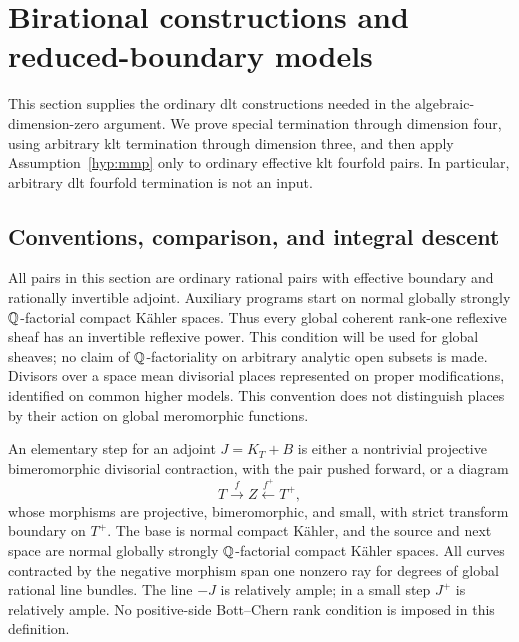 \section{Birational constructions and reduced-boundary models}
\label{bir:section}

This section supplies the ordinary dlt constructions needed in the
algebraic-dimension-zero argument.  We prove special termination through
dimension four, using arbitrary klt termination through dimension three,
and then apply Assumption~\ref{hyp:mmp} only to ordinary effective klt
fourfold pairs.  In particular, arbitrary dlt fourfold termination is not
an input.

\subsection{Conventions, comparison, and integral descent}
\label{bir:conventions}

All pairs in this section are ordinary rational pairs with effective
boundary and rationally invertible adjoint.  Auxiliary programs start
on normal globally strongly $\mathbb{Q}$-factorial compact K\"ahler spaces.
Thus every global coherent rank-one reflexive sheaf has an invertible
reflexive power.  This condition will be used for global sheaves; no
claim of $\mathbb{Q}$-factoriality on arbitrary analytic open subsets is made.
Divisors over a space mean divisorial places represented on proper
modifications, identified on common higher models.  This convention
does not distinguish places by their action on global meromorphic
functions.

\begin{definition}
\label{bir:elementary}
An elementary step for an adjoint $J=K_T+B$ is either a nontrivial
projective bimeromorphic divisorial contraction, with the pair pushed
forward, or a diagram
\begin{equation}
 T\xrightarrow{f} Z\xleftarrow{f^+}T^+,
 \label{bir:small-diagram}
\end{equation}
whose morphisms are projective, bimeromorphic, and small, with strict
transform boundary on $T^+$.  The base is normal compact K\"ahler, and
the source and next space are normal globally strongly $\mathbb{Q}$-factorial
compact K\"ahler spaces.  All curves contracted by the negative
morphism span one nonzero ray for degrees of global rational line
bundles.  The line $-J$ is relatively ample; in a small step $J^+$ is
relatively ample.  No positive-side Bott--Chern rank condition is
imposed in this definition.
\end{definition}


